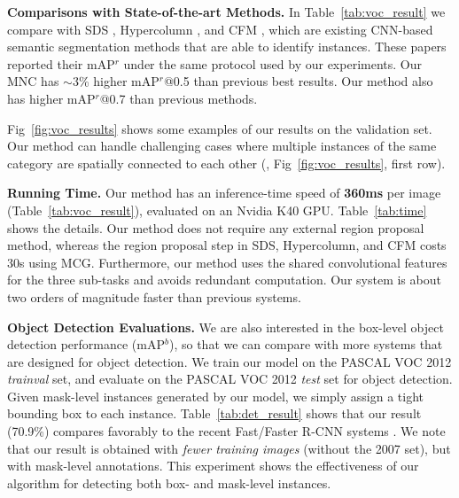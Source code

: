 \documentclass[10pt,twocolumn,letterpaper]{article}
\begin{document}
\vspace{.5em}
\noindent\textbf{Comparisons with State-of-the-art Methods.} In Table~\ref{tab:voc_result} we compare with SDS \cite{Hariharan2014}, Hypercolumn \cite{Hariharan2015}, and CFM \cite{Dai2015}, which are existing CNN-based semantic segmentation methods that are able to identify instances. These papers reported their mAP$^r$ under the same protocol used by our experiments.
Our MNC has $\sim$3\% higher mAP$^r$@0.5 than previous best results. Our method also has higher mAP$^r$@0.7 than previous methods.


Fig~\ref{fig:voc_results} shows some examples of our results on the validation set. Our method can handle challenging cases where multiple instances of the same category are spatially connected to each other (\eg, Fig~\ref{fig:voc_results}, first row).

\vspace{.5em}
\noindent\textbf{Running Time.}
Our method has an inference-time speed of \textbf{360ms} per image (Table~\ref{tab:voc_result}), evaluated on an Nvidia K40 GPU. Table~\ref{tab:time} shows the details.
Our method does not require any external region proposal method, whereas the region proposal step in SDS, Hypercolumn, and CFM costs 30s using MCG. Furthermore, our method uses the shared convolutional features for the three sub-tasks and avoids redundant computation. Our system is about two orders of magnitude faster than previous systems.

\vspace{.5em}
\noindent\textbf{Object Detection Evaluations.} We are also interested in the box-level object detection performance (mAP$^b$), so that we can compare with more systems that are designed for object detection.
We train our model on the PASCAL VOC 2012 \emph{trainval} set, and evaluate on the PASCAL VOC 2012 \emph{test} set for object detection.
Given mask-level instances generated by our model, we simply assign a tight bounding box to each instance.
Table~\ref{tab:det_result} shows that our result (70.9\%) compares favorably to the recent Fast/Faster R-CNN systems \cite{Girshick2015,Ren2015}. We note that our result is obtained with \emph{fewer training images} (without the 2007 set), but with mask-level annotations. This experiment shows the effectiveness of our algorithm for detecting both box- and mask-level instances.
\end{document}
